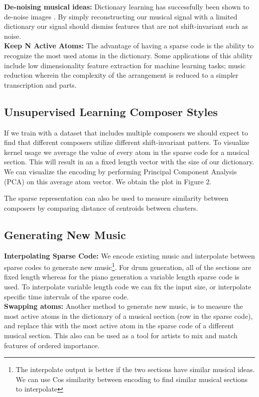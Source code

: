 \documentclass[11pt,a4paper]{article}
\begin{document}
 \textbf{De-noising musical ideas: } Dictionary learning has successfully been shown to de-noise images  \cite{Beckouche_2013}. By simply reconstructing our musical signal with a limited dictionary our signal should dismiss features that are not shift-invariant such as noise.
\\
 \textbf{Keep N Active Atoms: } The advantage of having a sparse code is the ability to recognize the most used atoms in the dictionary. Some applications of this ability include low dimensionality feature extraction for machine learning tasks; music reduction wherein the complexity of the arrangement is reduced to a simpler transcription and parts. 

\subsection{Unsupervised Learning Composer Styles }
If we train with a dataset that includes multiple composers we should expect to find that different composers utilize different shift-invariant patters. To visualize kernel usage we average the value of every atom in the sparse code for a musical section. This will result in an a fixed length vector with the size of our dictionary. We can visualize the encoding by performing Principal Component Analysis (PCA) on this average atom vector. We obtain the plot in Figure 2. 

The sparse representation can also be used to measure similarity between composers by comparing distance of centroids between clusters.  

\subsection{Generating New Music}
 \textbf{Interpolating Sparse Code: } We encode existing music and interpolate between sparse codes to generate new music\footnote{The interpolate output is better if the two sections have similar musical ideas. We can use Cos similarity between encoding to find similar musical sections to interpolate}. For drum generation, all of the sections are fixed length whereas for the piano generation a variable length sparse code is used. To interpolate variable length code we can fix the input size, or interpolate specific time intervals of the sparse code.
 \\
 \textbf{Swapping atoms: } Another method to generate new music, is to measure the most active atoms in the dictionary of a musical section (row in the sparse code), and replace this with the most active atom in the sparse code of a different musical section. This also can be used as a tool for artists to mix and match features of ordered importance. 
\end{document}
